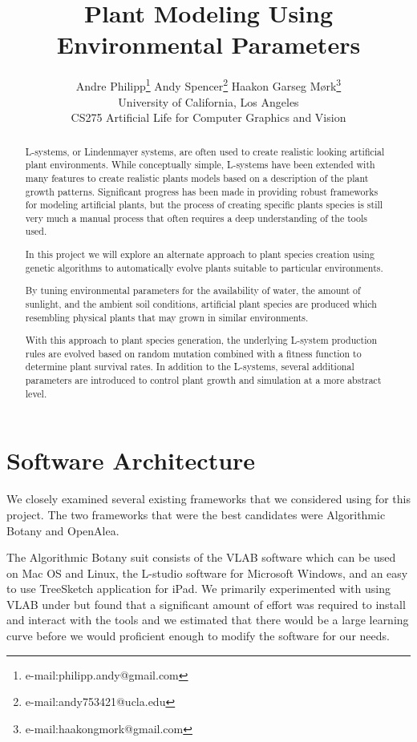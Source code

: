 \documentclass[conference]{acmsiggraph}
\title{Plant Modeling Using Environmental Parameters}
\author{
  Andre Philipp\thanks{e-mail:philipp.andy@gmail.com}
  \qquad
  Andy Spencer\thanks{e-mail:andy753421@ucla.edu}
  \qquad
  Haakon Garseg Mørk\thanks{e-mail:haakongmork@gmail.com}
  \\
  University of California, Los Angeles \\
  CS275 Artificial Life for Computer Graphics and Vision
}
\begin{document}

\maketitle

\begin{abstract}

L-systems, or Lindenmayer systems, are often used to create realistic looking
artificial plant environments. While conceptually simple, L-systems have been
extended with many features to create realistic plants models based on a
description of the plant growth patterns. Significant progress has been made in
providing robust frameworks for modeling artificial plants, but the process of
creating specific plants species is still very much a manual process that often
requires a deep understanding of the tools used.

In this project we will explore an alternate approach to plant species creation
using genetic algorithms to automatically evolve plants suitable to particular
environments.

By tuning environmental parameters for the availability of water, the amount of
sunlight, and the ambient soil conditions, artificial plant species are produced
which resembling physical plants that may grown in similar environments.

With this approach to plant species generation, the underlying L-system
production rules are evolved based on random mutation combined with a fitness
function to determine plant survival rates. In addition to the L-systems,
several additional parameters are introduced to control plant growth and
simulation at a more
abstract level.

\end{abstract}

\keywordlist


\section{Software Architecture}

We closely examined several existing frameworks that we considered using for
this project. The two frameworks that were the best candidates were Algorithmic
Botany\cite{abotany} and OpenAlea\cite{openalea}.

The Algorithmic Botany suit consists of the VLAB software which can be used on
Mac OS and Linux, the L-studio software for Microsoft Windows, and an easy to
use TreeSketch application for iPad. We primarily experimented with using VLAB
under but found that a significant amount of effort was required to install and
interact with the tools and we estimated that there would be a large learning
curve before we would proficient enough to modify the software for our needs.
\end{document}
